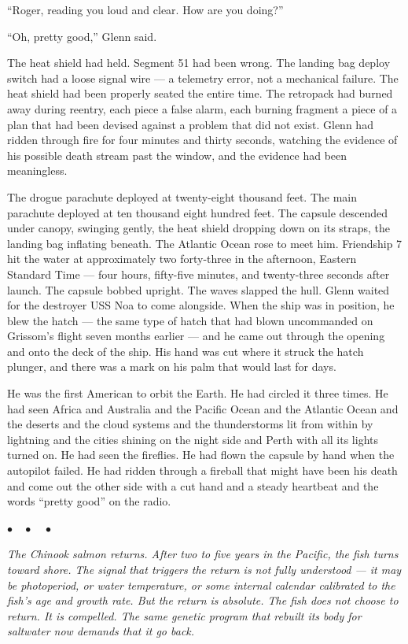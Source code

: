 \documentclass[12pt, letterpaper]{article}
\begin{document}
``Roger, reading you loud and clear. How are you doing?''

``Oh, pretty good,'' Glenn said.

The heat shield had held. Segment 51 had been wrong. The landing bag deploy switch had a loose signal wire --- a telemetry error, not a mechanical failure. The heat shield had been properly seated the entire time. The retropack had burned away during reentry, each piece a false alarm, each burning fragment a piece of a plan that had been devised against a problem that did not exist. Glenn had ridden through fire for four minutes and thirty seconds, watching the evidence of his possible death stream past the window, and the evidence had been meaningless.

The drogue parachute deployed at twenty-eight thousand feet. The main parachute deployed at ten thousand eight hundred feet. The capsule descended under canopy, swinging gently, the heat shield dropping down on its straps, the landing bag inflating beneath. The Atlantic Ocean rose to meet him. Friendship 7 hit the water at approximately two forty-three in the afternoon, Eastern Standard Time --- four hours, fifty-five minutes, and twenty-three seconds after launch. The capsule bobbed upright. The waves slapped the hull. Glenn waited for the destroyer USS Noa to come alongside. When the ship was in position, he blew the hatch --- the same type of hatch that had blown uncommanded on Grissom's flight seven months earlier --- and he came out through the opening and onto the deck of the ship. His hand was cut where it struck the hatch plunger, and there was a mark on his palm that would last for days.

He was the first American to orbit the Earth. He had circled it three times. He had seen Africa and Australia and the Pacific Ocean and the Atlantic Ocean and the deserts and the cloud systems and the thunderstorms lit from within by lightning and the cities shining on the night side and Perth with all its lights turned on. He had seen the fireflies. He had flown the capsule by hand when the autopilot failed. He had ridden through a fireball that might have been his death and come out the other side with a cut hand and a steady heartbeat and the words ``pretty good'' on the radio.

\begin{center}
$\bullet\quad\bullet\quad\bullet$
\end{center}

\emph{The Chinook salmon returns. After two to five years in the Pacific, the fish turns toward shore. The signal that triggers the return is not fully understood --- it may be photoperiod, or water temperature, or some internal calendar calibrated to the fish's age and growth rate. But the return is absolute. The fish does not choose to return. It is compelled. The same genetic program that rebuilt its body for saltwater now demands that it go back.}
\end{document}
